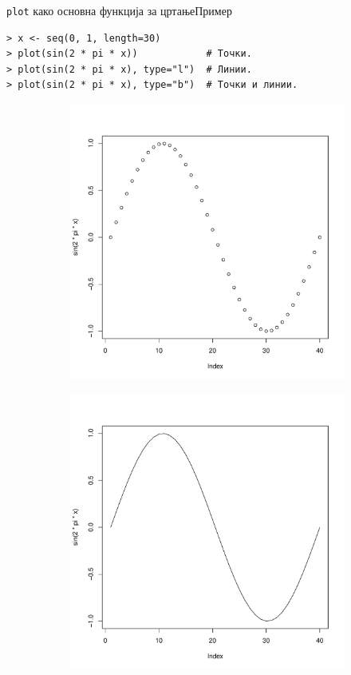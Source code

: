 \documentclass[hyperref={unicode}, xcolor={svgnames, table},
usepdftitle=false]{beamer}
\theoremstyle{remark}
\begin{document}
\begin{frame}[fragile]{\texttt{plot} како основна функција за
    цртање}{Пример}
\begin{verbatim}
> x <- seq(0, 1, length=30)
> plot(sin(2 * pi * x))            # Точки.
> plot(sin(2 * pi * x), type="l")  # Линии.
> plot(sin(2 * pi * x), type="b")  # Точки и линии.
\end{verbatim}
\begin{figure}
  \centering
  \begin{subfigure}[b]{.3\linewidth}
    \includegraphics[width=\textwidth]{Plot_Points_Sine.pdf}
  \end{subfigure}
  \begin{subfigure}[b]{.3\linewidth}
    \includegraphics[width=\textwidth]{Plot_Line_Sine.pdf}

\end{subfigure}
\end{figure}
\end{frame}
\end{document}
